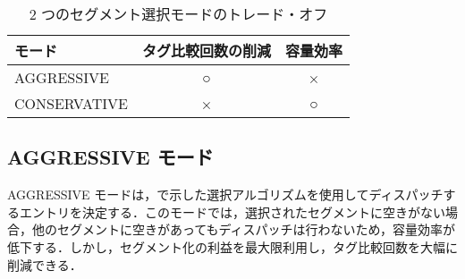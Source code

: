 \begin{table}[tb]
  \caption{2 つのセグメント選択モードのトレード・オフ}
  \footnotesize
  \center
   \begin{tabular}{l|c|c} \hline \hline
   モード & タグ比較回数の削減 & 容量効率 \\ \hline
   AGGRESSIVE & ○ & × \\
   CONSERVATIVE & × & ○ \\ \hline
  \end{tabular}
  \label{tab:switch_trade_off}
\end{table}

\subsection{AGGRESSIVE モード}
AGGRESSIVE モードは，で示した選択アルゴリズムを使用してディスパッチするエントリを決定する．このモードでは，選択されたセグメントに空きがない場合，他のセグメントに空きがあってもディスパッチは行わないため，容量効率が低下する．しかし，セグメント化の利益を最大限利用し，タグ比較回数を大幅に削減できる．

